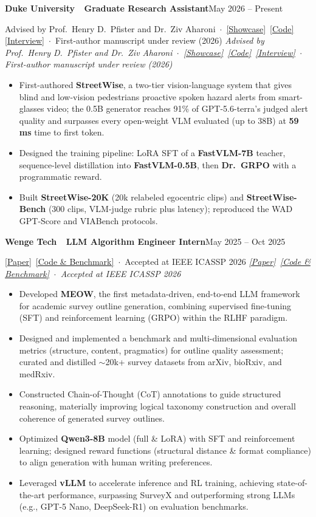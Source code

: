 \documentclass[10pt,letterpaper]{article}
\newcommand{\entry}[4]{%
  \noindent\textbf{\color{ink}#1}\hfill{\color{soft}\small #3}\par%
  \def\tmp{#2}\ifx\tmp\empty\else%
    {\itshape\color{muted}\small #2}\hfill\textit{\color{soft}\small #4}\par%
  \fi%
  \vspace{1pt}%
}
\begin{document}
\entry{Duke University \,\textemdash\, Graduate Research Assistant}{Advised by Prof.\ Henry D.\ Pfister and Dr.\ Ziv Aharoni \,$\cdot$\, \href{https://cedricshan.github.io/streetwise/}{[Showcase]} \,\href{https://anonymous.4open.science/r/streetwise-B7E9}{[Code]} \,\href{https://www.youtube.com/watch?v=A2kWoNUxzRc&t=81s}{[Interview]} \,$\cdot$\, {\color{accent}First-author manuscript under review (2026)}}{May 2026 -- Present}{}
\begin{itemize}
  \item First-authored \textbf{StreetWise}, a two-tier vision-language system that gives blind and low-vision pedestrians proactive spoken hazard alerts from smart-glasses video; the 0.5B generator reaches 91\% of GPT-5.6-terra's judged alert quality and surpasses every open-weight VLM evaluated (up to 38B) at \textbf{59\,ms} time to first token.
  \item Designed the training pipeline: LoRA SFT of a \textbf{FastVLM-7B} teacher, sequence-level distillation into \textbf{FastVLM-0.5B}, then \textbf{Dr.~GRPO} with a programmatic reward.
  \item Built \textbf{StreetWise-20K} (20k relabeled egocentric clips) and \textbf{StreetWise-Bench} (300 clips, VLM-judge rubric plus latency); reproduced the WAD GPT-Score and VIABench protocols.
\end{itemize}
\vspace{1pt}
\entry{Wenge Tech \,\textemdash\, LLM Algorithm Engineer Intern}{\href{https://ieeexplore.ieee.org/document/11462654}{[Paper]} \,\href{https://github.com/cedricshan/Survey-Outline-Evaluation-Benckmark}{[Code \& Benchmark]} \,$\cdot$\, {\color{accent}Accepted at IEEE ICASSP 2026}}{May 2025 -- Oct 2025}{}
\begin{itemize}
  \item Developed \textbf{MEOW}, the first metadata-driven, end-to-end LLM framework for academic survey outline generation, combining supervised fine-tuning (SFT) and reinforcement learning (GRPO) within the RLHF paradigm.
  \item Designed and implemented a benchmark and multi-dimensional evaluation metrics (structure, content, pragmatics) for outline quality assessment; curated and distilled $\sim$20k+ survey datasets from arXiv, bioRxiv, and medRxiv.
  \item Constructed Chain-of-Thought (CoT) annotations to guide structured reasoning, materially improving logical taxonomy construction and overall coherence of generated survey outlines.
  \item Optimized \textbf{Qwen3-8B} model (full \& LoRA) with SFT and reinforcement learning; designed reward functions (structural distance \& format compliance) to align generation with human writing preferences.
  \item Leveraged \textbf{vLLM} to accelerate inference and RL training, achieving state-of-the-art performance, surpassing SurveyX and outperforming strong LLMs (e.g., GPT-5 Nano, DeepSeek-R1) on evaluation benchmarks.
\end{itemize}
\end{document}
